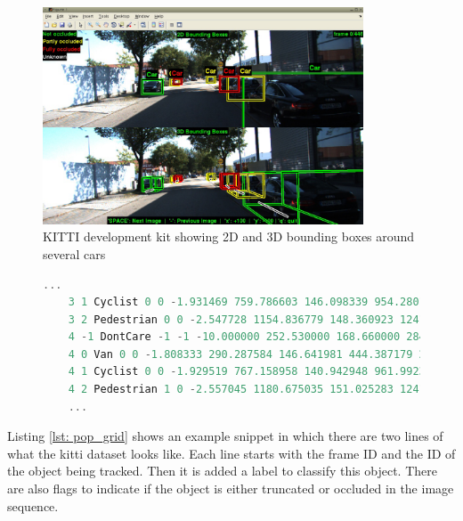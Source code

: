 \begin{figure}[htp]
	
	\centering
	\includegraphics[width=0.85\textwidth]{capstate/imgs/kittidk.png}
	
	\caption{KITTI development kit showing 2D and 3D bounding boxes around several cars}
	\label{fig:kittidk}
	
\end{figure}

\begin{figure}
\begin{center}
	\begin{lstlisting}[caption={KITTI dataset file snippet.}, language=c++, label={lst: pop_grid}]
	...
	3 1 Cyclist 0 0 -1.931469 759.786603 146.098339 954.280160 374.000000 1.739063 0.824591 1.785241 1.821119 1.569936 5.783265 -1.642450
	3 2 Pedestrian 0 0 -2.547728 1154.836779 148.360923 1241.000000 321.627088 1.714062 0.767881 0.972283 6.463579 1.474131 7.560739 -1.860031
	4 -1 DontCare -1 -1 -10.000000 252.530000 168.660000 284.460000 202.850000 -1000.000000 -1000.000000 -1000.000000 -10.000000 -1.000000 -1.000000 -1.000000
	4 0 Van 0 0 -1.808333 290.287584 146.641981 444.387179 269.473545 2.000000 1.823255 4.433886 -4.934786 1.601945 14.098646 -2.139796
	4 1 Cyclist 0 0 -1.929519 767.158958 140.942948 961.992360 374.000000 1.739063 0.824591 1.785241 1.881359 1.534695 5.785600 -1.631447
	4 2 Pedestrian 1 0 -2.557045 1180.675035 151.025283 1241.000000 325.015204 1.714062 0.767881 0.972283 6.516488 1.497786 7.267796 -1.846627
	...	\end{lstlisting}
\end{center}
\end{figure}

Listing \ref{lst: pop_grid} shows an example snippet in which there are two lines of what the \gls{kitti} dataset looks like. Each line starts with the frame ID and the ID of the object being tracked. Then it is added a label to classify this object. There are also flags to indicate if the object is either truncated or occluded in the image sequence. 

